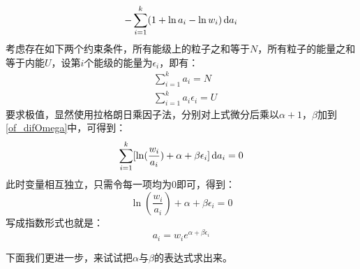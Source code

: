 \begin{prove}
\begin{equation}
                -\sum_{i=1}^{k}(1+\ln a_i-\ln w_i)\dif{a_i} 
                \label{of_difOmega}
            \end{equation}
            考虑存在如下两个约束条件，所有能级上的粒子之和等于$N$，所有粒子的能量之和等于内能$U$，设第$i$个能级的能量为$\epsilon_i$，即有：
            \begin{equation}
                \begin{aligned}
                    &\sum_{i=1}^{k}a_i = N\\
                    &\sum_{i=1}^{k}a_i \epsilon_i = U
                    \label{of_U}
                \end{aligned}
            \end{equation}
            要求极值，显然使用拉格朗日乘因子法，分别对上式微分后乘以$\alpha + 1$，$\beta$加到\ref{of_difOmega}中，可得到：
            \begin{equation}
                \sum_{i=1}^{k} [\ln(\frac{w_i}{a_i})+\alpha+\beta \epsilon_i] \dif{a_i} = 0
            \end{equation}
            此时变量相互独立，只需令每一项均为0即可，得到：
            \begin{equation}
                \ln(\frac{w_i}{a_i})+\alpha+\beta \epsilon_i = 0
                \label{of_a_i}
            \end{equation}
            写成指数形式也就是：
            \begin{equation}
                a_i = w_i e^{\alpha + \beta \epsilon_i}
                \label{of_a_i_2}
            \end{equation}

            下面我们更进一步，来试试把$\alpha$与$\beta$的表达式求出来。


\end{prove}
